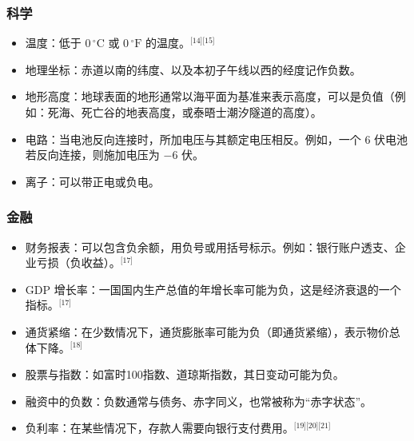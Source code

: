 \subsubsection{科学}
\begin{itemize}
\item 温度：低于 $0 \,^\circ\text{C}$ 或 $0 \,^\circ\text{F}$ 的温度。\(^\text{[14][15]}\)
\item 地理坐标：赤道以南的纬度、以及本初子午线以西的经度记作负数。
\item 地形高度：地球表面的地形通常以海平面为基准来表示高度，可以是负值（例如：死海、死亡谷的地表高度，或泰晤士潮汐隧道的高度）。
\item 电路：当电池反向连接时，所加电压与其额定电压相反。例如，一个 6 伏电池若反向连接，则施加电压为 $-6$ 伏。
\item 离子：可以带正电或负电。
\end{itemize}
\subsubsection{金融}
\begin{itemize}
\item 财务报表：可以包含负余额，用负号或用括号标示。例如：银行账户透支、企业亏损（负收益）。\(^\text{[17]}\)
\item GDP 增长率：一国国内生产总值的年增长率可能为负，这是经济衰退的一个指标。\(^\text{[17]}\)
\item 通货紧缩：在少数情况下，通货膨胀率可能为负（即通货紧缩），表示物价总体下降。\(^\text{[18]}\)
\item 股票与指数：如富时100指数、道琼斯指数，其日变动可能为负。
\item 融资中的负数：负数通常与债务、赤字同义，也常被称为“赤字状态”。
\item 负利率：在某些情况下，存款人需要向银行支付费用。\(^\text{[19][20][21]}\)
\end{itemize}
